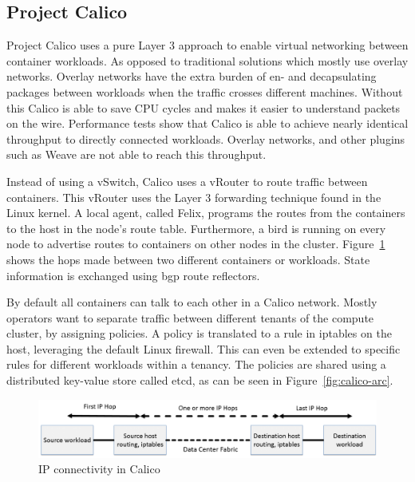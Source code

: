 \subsection{Project Calico}
Project Calico uses a pure Layer 3 approach to enable virtual networking between container workloads. As opposed to traditional solutions which mostly use overlay networks. Overlay networks have the extra burden of en- and decapsulating packages between workloads when the traffic crosses different machines. Without this Calico is able to save CPU cycles and makes it easier to understand packets on the wire. Performance tests\cite{dzone, dataplane, chunqi} show that Calico is able to achieve nearly identical throughput to directly connected workloads. Overlay networks, and other plugins such as Weave\cite{weave} are not able to reach this throughput.

Instead of using a vSwitch, Calico uses a vRouter to route traffic between containers. This vRouter uses the Layer 3 forwarding technique found in the Linux kernel. A local agent, called Felix, programs the routes from the containers to the host in the node's route table. Furthermore, a \gls{bird} is running on every node to advertise routes to containers on other nodes in the cluster. Figure~\ref{fig:hops} shows the hops made between two different containers or workloads. State information is exchanged using \gls{bgp} route reflectors.

By default all containers can talk to each other in a Calico network. Mostly operators want to separate traffic between different tenants of the compute cluster, by assigning policies. A policy is translated to a rule in iptables\cite{iptables} on the host, leveraging the default Linux firewall. This can even be extended to specific rules for different workloads within a tenancy. The policies are shared using a distributed key-value store called etcd\cite{etcd}, as can be seen in Figure~\ref{fig:calico-arc}.

\begin{figure}
    \centering
    \includegraphics[scale=0.35]{images/calico-hops}
    \caption{IP connectivity in Calico\cite{calico_learn}}
    \label{fig:hops}
\end{figure}


